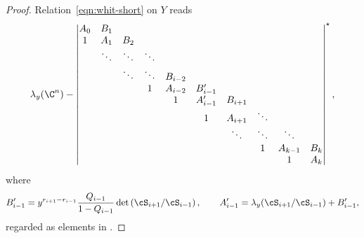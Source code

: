 \begin{proof}
Relation~\eqref{eqn:whit-short} on $Y$ reads
\begin{gather}\label{eqn:whitY}
 \lambda_y(\C^n)-\begin{vmatrix}
 A_0 & B_1 & & & \\
 1 & A_1 & B_2 & & \\ & \ddots & \ddots & \ddots & \\
 & & \ddots & \ddots & B_{i-2}\\ & & & 1 & A_{i-2} & B'_{i-1}\\ & & & & 1 & A'_{i-1} & B_{i+1}\\ & & & & & 1 & A_{i+1} & \ddots
 \\ & & & & & & \ddots & \ddots & \ddots \\ & & & & & & & 1 & A_{k-1} & B_{k}\\ & & & & & & & & 1 & A_{k}
 \end{vmatrix}^\star,
\end{gather}
where
\begin{gather*}
 B_{i-1}'=y^{r_{i+1}-r_{i-1}}\frac{Q_{i-1}}{1-Q_{i-1}}\det\left(\cS_{i+1}/\cS_{i-1}\right),\qquad A_{i-1}'=\lambda_y(\cS_{i+1}/\cS_{i-1})+B'_{i-1},
\end{gather*}
regarded as elements in .


\end{proof}
